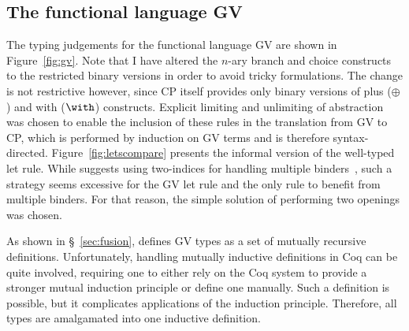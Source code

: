 \subsection{The functional language GV}\label{sec:gv}




The typing judgements for the functional language GV are shown in
Figure~\ref{fig:gv}. Note that I have altered the $n$-ary branch and choice
constructs to the restricted binary versions in order to avoid tricky
formulations. The change is not restrictive however, since CP itself provides
only binary versions of plus ($\oplus$) and with ($\with$)
constructs. Explicit limiting and unlimiting of abstraction was chosen to
enable the inclusion of these rules in the translation from GV to CP, which is
performed by induction on GV terms and is therefore
syntax-directed. Figure~\ref{fig:letscompare} presents the informal version of
the well-typed let rule. While \citeauthor{Char:2012} suggests using
two-indices for handling multiple binders~\cite{Char:2012}, such a strategy
seems excessive for the GV let rule and the only rule to benefit from multiple
binders. For that reason, the simple solution of performing two openings was
chosen.

As shown in \S~\ref{sec:fusion}, \citeauthor{Wadler:2014} defines GV types as
a set of mutually recursive definitions. Unfortunately, handling mutually
inductive definitions in Coq can be quite involved, requiring one to either
rely on the Coq system to provide a stronger mutual induction principle or
define one manually. Such a definition is possible, but it complicates
applications of the induction principle. Therefore, all types are amalgamated
into one inductive definition.



